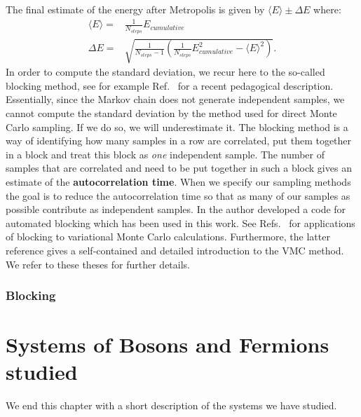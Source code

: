 \documentclass[twoside,english]{uiofysmaster}
\begin{document}
The final estimate of the energy after Metropolis is given by $\langle
E \rangle \pm \Delta E$ where:
\begin{align}
	\langle E \rangle =& \frac{1}{N_{steps}} E_{cumulative} \\
	\Delta E =& \sqrt{ \frac{1}{N_{steps}-1} ( \frac{1}{N_{steps}} E_{cumulative}^2 - \langle E \rangle^2 ) }.
\end{align}
In order to compute the standard deviation, we recur here to the
so-called blocking method, see for example
Ref.~\cite{Jonsson2018} for a recent pedagogical description. Essentially, since the Markov chain does not generate independent samples, we cannot compute the standard deviation by the method used for direct Monte Carlo sampling. If we do so, we will underestimate it. The blocking method is a way of identifying how many samples in a row are correlated, put them together in a block and treat this block as \textit{one} independent sample. The number of samples that are correlated and need to be put together in such a block gives an estimate of the \textbf{autocorrelation time}. When we specify our sampling methods the goal is to reduce the autocorrelation time so that as many of our samples as possible contribute as independent samples. In \cite{Jonsson2018} the author developed a code for automated blocking which has been used in this work.
See Refs.~\cite{Ledum2017,Mariadason2018}  for applications of blocking to
variational Monte Carlo calculations. Furthermore, the latter
reference gives a self-contained and detailed introduction to the VMC
method. We refer to these theses for further details.


\subsubsection{Blocking}



\section{Systems of Bosons and Fermions studied}

We end this chapter with a short description of the systems we have studied.
\end{document}

